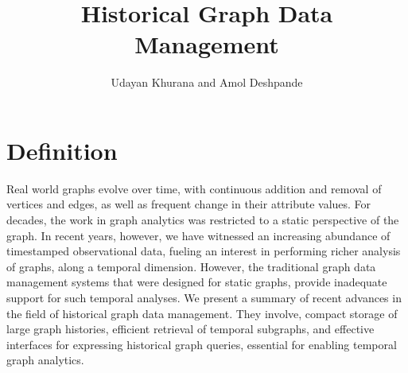\documentclass[graybox, natbib, nosecnum, twocolumn]{svmult}
\begin{document}
\title*{Historical Graph Data Management}
\author{Udayan Khurana and Amol Deshpande}


%
\maketitle



\section{Definition}
Real world graphs evolve over time, with continuous addition and removal of vertices and edges, as well as frequent change in their attribute values. 
For decades, the work in graph analytics was restricted to a static perspective of the graph. 
In recent years, however, we have witnessed an increasing abundance of timestamped observational data, 
fueling an interest in performing richer analysis of graphs, along a temporal dimension. 
However, the traditional graph data management systems that were designed for static graphs, provide inadequate support for such temporal analyses. 
We present a summary of recent advances in the field of historical graph data management. They involve, compact storage of large graph histories, efficient retrieval of temporal subgraphs, and effective interfaces for expressing historical graph queries, essential for enabling temporal graph analytics.  
\end{document}
